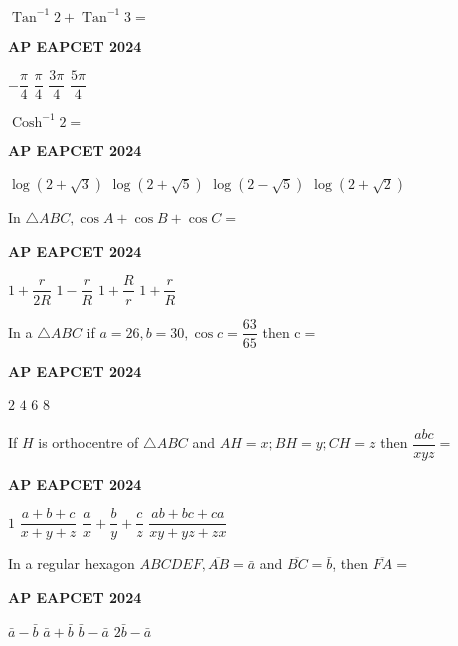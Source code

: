 \documentclass[11pt,paper=a4,answers]{exam}
\begin{document}
\begin{multicols}{2}
\begin{questions}
\question
$\operatorname{Tan}^{-1} 2+\operatorname{Tan}^{-1} 3=$
\begin{flushright}
\small\textbf{AP EAPCET 2024}
\end{flushright}
\begin{choices}
  \choice $-\dfrac{\pi}{4}$
  \choice $\dfrac{\pi}{4}$ 
  \choice $\dfrac{3 \pi}{4}$ 
  \choice $\dfrac{5 \pi}{4}$
\end{choices}


\question
$\operatorname{Cosh}^{-1} 2=$
\begin{flushright}
\small\textbf{AP EAPCET 2024}
\end{flushright}
\begin{choices}
  \choice $\log (2+\sqrt{3})$ 
  \choice $\log (2+\sqrt{5})$
  \choice $\log (2-\sqrt{5})$ 
  \choice $\log (2+\sqrt{2})$
\end{choices}



\question
In $\triangle A B C, \cos A+\cos B+\cos C=$
\begin{flushright}
\small\textbf{AP EAPCET 2024}
\end{flushright}
\begin{choices}
  \choice $1+\dfrac{r}{2 R}$ 
  \choice $1-\dfrac{r}{ R}$
  \choice $1+\dfrac{R}{r}$
  \choice $1+\dfrac{r}{ R}$
\end{choices}



\question
In a $\triangle A B C$ if $a=26, b=30, \cos c=\dfrac{63}{65}$ then $\mathrm{c}=$
\begin{flushright}
\small\textbf{AP EAPCET 2024}
\end{flushright}
\begin{choices}
  \choice $2$ 
  \choice $4$ 
  \choice $6$ 
  \choice $8$ 
\end{choices}


\question
If $H$ is orthocentre of $\triangle A B C$ and $A H=x ; B H=y ; C H=z$ then $\dfrac{a b c}{x y z}=$
\begin{flushright}
\small\textbf{AP EAPCET 2024}
\end{flushright}
\begin{choices}
  \choice $1$ 
  \choice $\dfrac{a+b+c}{x+y+z}$
  \choice $\dfrac{a}{x}+\dfrac{b}{y}+\dfrac{c}{z}$
  \choice $\dfrac{a b+b c+c a}{x y+y z+z x}$
\end{choices}



\question
In a regular hexagon $A B C D E F, \overline{A B}=\bar{a}$ and $\overline{B C}=\bar{b}$, then $\overline{F A}=$
\begin{flushright}
\small\textbf{AP EAPCET 2024}
\end{flushright}
\begin{choices}
  \choice $\bar{a}-\bar{b}$
  \choice $\bar{a}+\bar{b}$ 
  \choice $\bar{b}-\bar{a}$ 
  \choice $2 \bar{b}-\bar{a}$
\end{choices}



\end{questions}
\end{multicols}
\end{document}
